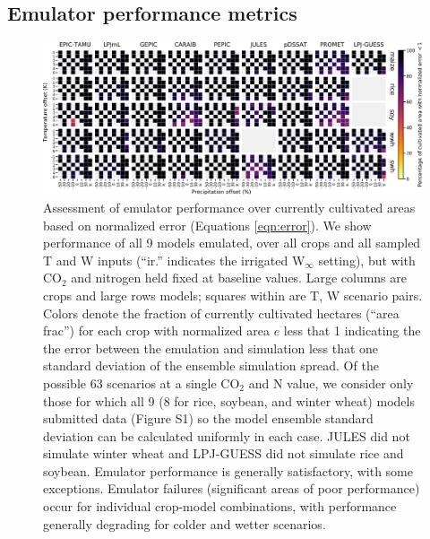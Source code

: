 \documentclass[gmd, manuscript]{copernicus} %
\begin{document}
\subsection{Emulator performance metrics}
\label{S:4.1}
\begin{figure}[ht]
\centering
    \includegraphics[width=16.3cm]{figures/error_grid_new.png}
    \caption{
    Assessment of emulator performance over currently cultivated areas based on normalized error (Equations \ref{eqn:error}). 
    We show performance of all 9 models emulated, over all crops and all sampled T and W inputs (``ir.'' indicates the irrigated W$_{\infty}$ setting), but with CO$_2$ and nitrogen held fixed at baseline values. 
    Large columns are crops and large rows models; squares within are T, W scenario pairs. 
    Colors denote the fraction of currently cultivated hectares (``area frac'') for each crop with normalized area $e$ less that 1 indicating the the error between the emulation and simulation less that one standard deviation of the ensemble simulation spread. 
    Of the possible 63 scenarios at a single CO$_2$ and N value, we consider only those for which all 9 (8 for rice, soybean, and winter wheat) models submitted data (Figure S1) so the model ensemble standard deviation can be calculated uniformly in each case. 
    JULES did not simulate winter wheat and LPJ-GUESS did not simulate rice and soybean. Emulator performance is generally satisfactory, with some exceptions. 
    Emulator failures (significant areas of poor performance) occur for individual crop-model combinations, with performance generally degrading for colder and wetter scenarios.
    }
   \label{fig:error_360}
\end{figure}
\end{document}
